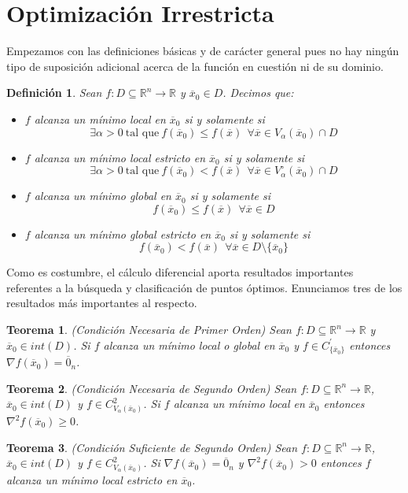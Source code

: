 \documentclass[11pt]{report}
\newtheorem{definition}{Definición}[section]
\newtheorem{theorem}{Teorema}[section]
\newcommand{\Rn}{\mathbb{R}^{n}}
\newcommand{\R}{\mathbb{R}}
\newcommand{\x}{\overline{x}}
\newcommand{\xz}{\overline{x}_{0}}
\newcommand{\z}{\overline{0}_{n}}
\begin{document}
\section{Optimización Irrestricta}
Empezamos con las definiciones básicas y de carácter general pues no hay ningún tipo de suposición adicional acerca de la función en cuestión ni de su dominio.
\begin{definition}
Sean $f:D\subseteq\Rn\rightarrow\R$ y $\xz\in D$. Decimos que:
\begin{itemize}
\item[(i)] $f$ alcanza un mínimo local en $\xz$ si y solamente si $$\exists\alpha >0\ \text{tal que}\ f(\xz)\leq f(\x)\ \ \forall\x\in V_{\alpha}(\xz)\cap D$$
\item[(ii)] $f$ alcanza un mínimo local estricto en $\xz$ si y solamente si $$\exists\alpha >0\ \text{tal que}\ f(\xz)< f(\x)\ \ \forall\x\in V_{\alpha}^{\circ}(\xz)\cap D$$
\item[(iii)] $f$ alcanza un mínimo global en $\xz$ si y solamente si $$f(\xz)\leq f(\x)\ \ \forall\x\in D$$
\item[(iv)] $f$ alcanza un mínimo global estricto en $\xz$ si y solamente si $$f(\xz)< f(\x)\ \ \forall\x\in D\setminus\{\xz\}$$
\end{itemize}
\end{definition}

Como es costumbre, el cálculo diferencial aporta resultados importantes referentes a la búsqueda y clasificación de puntos óptimos. Enunciamos tres de los resultados más importantes al respecto.
\begin{theorem}{(Condición Necesaria de Primer Orden)}
Sean $f:D\subseteq\Rn\rightarrow\R$ y $\xz\in int(D)$. Si $f$ alcanza un mínimo local o global en $\xz$ y $f\in C_{\{\xz\}}^{'}$ entonces $\nabla f(\xz)=\z$.
\end{theorem}

\begin{theorem}{(Condición Necesaria de Segundo Orden)}
Sean $f:D\subseteq\Rn\rightarrow\R$, $\xz\in int(D)$ y $f\in C_{V_{\alpha}(\xz)}^{2}$. Si $f$ alcanza un mínimo local en $\xz$ entonces $\nabla^{2} f(\xz)\geq0$.
\end{theorem}

\begin{theorem}{(Condición Suficiente de Segundo Orden)}
Sean $f:D\subseteq\Rn\rightarrow\R$, $\xz\in int(D)$ y $f\in C_{V_{\alpha}(\xz)}^{2}$. Si $\nabla f(\xz)=\z$ y $\nabla^{2} f(\xz)>0$ entonces $f$ alcanza un mínimo local estricto en $\xz$.
\end{theorem}
\end{document}
